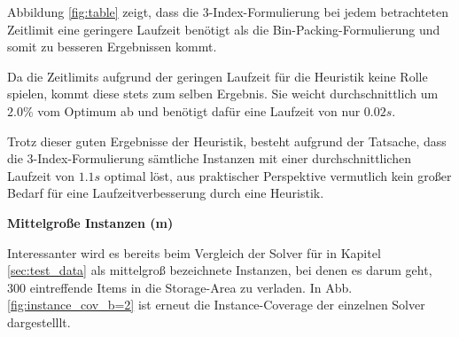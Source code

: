 Abbildung \ref{fig:table} zeigt, dass die 3-Index-Formulierung bei jedem betrachteten Zeitlimit eine geringere Laufzeit benötigt
als die Bin-Packing-Formulierung und somit zu besseren Ergebnissen kommt.

Da die Zeitlimits aufgrund der geringen Laufzeit für die Heuristik keine Rolle spielen, kommt diese stets zum selben Ergebnis.
Sie weicht durchschnittlich um $2.0 \%$ vom Optimum ab und benötigt dafür eine Laufzeit von nur $0.02s$.

Trotz dieser guten Ergebnisse der Heuristik, besteht aufgrund der Tatsache, dass die 3-Index-Formulierung sämtliche Instanzen
mit einer durchschnittlichen Laufzeit von $1.1s$ optimal löst, aus praktischer Perspektive vermutlich kein großer Bedarf für
eine Laufzeitverbesserung durch eine Heuristik.

\textbf{Mittelgroße Instanzen (m)}

Interessanter wird es bereits beim Vergleich der Solver für in Kapitel \ref{sec:test_data} als mittelgroß bezeichnete Instanzen,
bei denen es darum geht, $300$ eintreffende Items in die Storage-Area zu verladen.
In Abb. \ref{fig:instance_cov_b=2} ist erneut die Instance-Coverage der einzelnen Solver dargestelllt.


